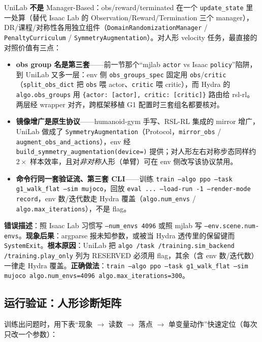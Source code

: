 UniLab \textbf{不是} Manager-Based：obs/reward/terminated 在一个 \texttt{update\_state} 里一处算（替代 Isaac Lab 的 Observation/Reward/Termination 三个 manager），DR/课程/对称性各用独立组件（\texttt{DomainRandomizationManager} / \texttt{PenaltyCurriculum} / \texttt{SymmetryAugmentation}）。对人形 velocity 任务，最直接的对照价值有三点：

\begin{itemize}
  \item \textbf{obs group 名是第三套}——前一节那个“mjlab \texttt{actor} vs Isaac \texttt{policy}”陷阱，到 UniLab 又多一层：env 侧 \texttt{obs\_groups\_spec} 固定用 \texttt{obs}/\allowbreak\texttt{critic}（\texttt{split\_obs\_dict} 把 \texttt{obs} 喂 actor、\texttt{critic} 喂 critic），而 Hydra 的 \texttt{algo.\allowbreak obs\_groups} 用 \texttt{\{actor: [actor], critic: [critic]\}} 路由给 rsl-rl。两层经 wrapper 对齐，跨框架移植 G1 配置时三套组名都要核对。
  \item \textbf{镜像增广是原生协议}——humanoid-gym 手写、RSL-RL 集成的 mirror 增广，UniLab 做成了 \texttt{SymmetryAugmentation}（Protocol，\texttt{mirror\_obs} / \texttt{augment\_obs\_and\_actions}），env 经 \texttt{build\_symmetry\_augmentation(device=)} 提供；对人形左右对称步态同样约 $2\times$ 样本效率，且对\emph{非对称}人形（单臂）可在 env 侧改写该协议禁用。
  \item \textbf{命令行同一套验证流、第三套 CLI}——训练 \texttt{train --algo ppo --task g1\_walk\_flat --sim mujoco}，回放 \texttt{eval ... --load-run -1 --render-mode record}，env 数/迭代数走 Hydra 覆盖（\texttt{algo.\allowbreak num\_envs} / \texttt{algo.\allowbreak max\_iterations}），不是 flag。
\end{itemize}

\begin{pitfall}
\textbf{错误描述}：照 Isaac Lab 习惯写 \texttt{--num\_envs 4096} 或照 mjlab 写 \texttt{--env.\allowbreak scene.\allowbreak num-envs}。\textbf{现象后果}：argparse 报未知参数，或被当 Hydra 透传里的保留键而 \texttt{SystemExit}。\textbf{根本原因}：UniLab 把 \texttt{algo /\allowbreak  task /\allowbreak  training.\allowbreak sim\_backend /\allowbreak  training.\allowbreak play\_only} 列为 RESERVED 必须用 flag，其余（含 env 数/迭代数）一律走 Hydra 覆盖。\textbf{正确做法}：\texttt{train --algo ppo --task g1\_walk\_flat --sim mujoco algo.\allowbreak num\_envs=4096 algo.\allowbreak max\_iterations=300}。
\end{pitfall}

\subsection{运行验证：人形诊断矩阵}
训练出问题时，用下表“现象 $\to$ 读数 $\to$ 落点 $\to$ 单变量动作”快速定位（每次只改一个参数）：

